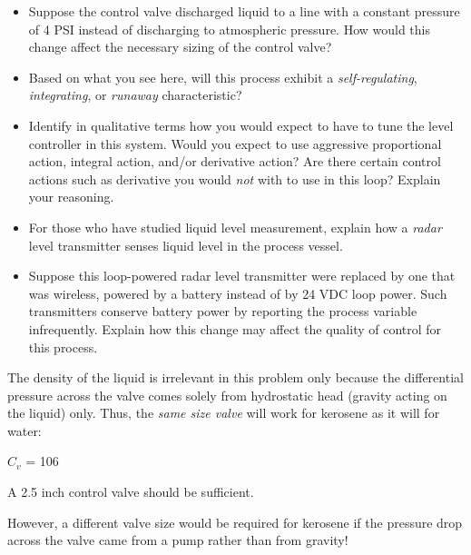 \begin{itemize}
\item{} Suppose the control valve discharged liquid to a line with a constant pressure of 4 PSI instead of discharging to atmospheric pressure.  How would this change affect the necessary sizing of the control valve?
\item{} Based on what you see here, will this process exhibit a {\it self-regulating}, {\it integrating}, or {\it runaway} characteristic?
\item{} Identify in qualitative terms how you would expect to have to tune the level controller in this system.  Would you expect to use aggressive proportional action, integral action, and/or derivative action?  Are there certain control actions such as derivative you would {\it not} with to use in this loop?  Explain your reasoning.
\item{} For those who have studied liquid level measurement, explain how a {\it radar} level transmitter senses liquid level in the process vessel.
\item{} Suppose this loop-powered radar level transmitter were replaced by one that was wireless, powered by a battery instead of by 24 VDC loop power.  Such transmitters conserve battery power by reporting the process variable infrequently.  Explain how this change may affect the quality of control for this process.
\end{itemize}







The density of the liquid is irrelevant in this problem only because the differential pressure across the valve comes solely from hydrostatic head (gravity acting on the liquid) only.  Thus, the {\it same size valve} will work for kerosene as it will for water:

\vskip 10pt

$C_v$ = 106
 
\vskip 10pt

A 2.5 inch control valve should be sufficient.

\vskip 10pt

However, a different valve size would be required for kerosene if the pressure drop across the valve came from a pump rather than from gravity!







